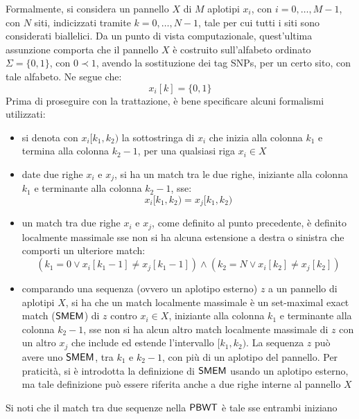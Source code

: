 Formalmente, si considera un pannello $X$ di $M$ aplotipi $x_i$, con
$i=0,\ldots, M-1$, con $N$ siti, indicizzati tramite $k=0,\ldots, N-1$, tale per
cui tutti i siti sono considerati biallelici. 
Da un punto di vista computazionale, quest'ultima
assunzione comporta che il pannello $X$ è costruito sull'alfabeto ordinato
$\Sigma =\{0,1\}$, con $0\prec 1$, avendo la sostituzione dei tag SNPs,
per un certo sito, con tale alfabeto. Ne segue che:
\begin{equation}
  \label{eq:pbwtdip}
  x_i[k]=\{0,1\}
\end{equation}
Prima di proseguire con la trattazione, è bene specificare alcuni
formalismi utilizzati:
\begin{itemize}
  \item si denota con $x_i[k_1,k_2)$ la
  sottostringa di $x_i$ che inizia alla colonna $k_1$ e termina alla
  colonna $k_2-1$, per una qualsiasi riga $x_i\in X$
  \item date due righe $x_i$ e $x_j$, si ha un match tra le due
  righe, iniziante
  alla colonna $k_1$ e terminante alla colonna $k_2-1$, sse:
  \begin{equation}
    \label{eq:pbwtmatch}
    x_i[k_1,k_2)=x_j[k_1,k_2)
  \end{equation}
  \item un match tra due righe $x_i$ e $x_j$, come definito al punto precedente,
  è definito localmente massimale sse non si ha alcuna estensione a
  destra o sinistra che comporti un ulteriore match:
  \begin{equation}
    \label{eq:pbwtmem}
    (k_1=0\lor x_i[k_1-1]\neq x_j[k_1-1])\land (k_2=N\lor x_i[k_2]\neq x_j[k_2])
  \end{equation}
  \item comparando una sequenza (ovvero un aplotipo esterno) $z$ a un pannello
  di aplotipi $X$, si ha che un match
  localmente massimale è un
  set-maximal exact match ($\mbox{\rm {\sf SMEM}}$) di $z$ contro $x_i\in X$, iniziante 
  alla colonna $k_1$ e terminante alla colonna $k_2-1$,
  sse non si ha alcun altro match localmente
  massimale di $z$ con un 
  altro $x_j$ che include ed estende l'intervallo $[k_1,k_2)$. La sequenza $z$
  può avere uno $\mbox{\rm {\sf SMEM}}$, tra $k_1$ e $k_2-1$, con più di un aplotipo del
  pannello. Per praticità, si è introdotta la definizione di $\mbox{\rm {\sf SMEM}}$ usando un
  aplotipo esterno, ma tale definizione può essere riferita anche a due righe
  interne al pannello $X$
\end{itemize}
Si noti che il match tra due sequenze nella $\mbox{\rm {\sf PBWT}}$ è tale sse entrambi iniziano
